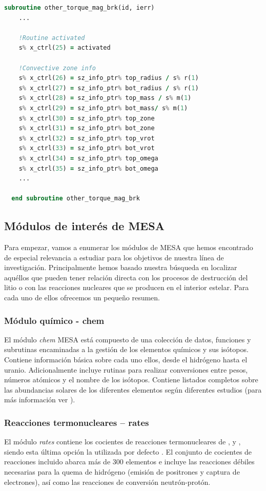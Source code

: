 \begin{lstlisting}[language=Fortran, float, caption={Ejemplo de asignación de valores calculados para la zona convectiva a los parámetros extras definidos.}, label={lst:extra_name_columns}]
  subroutine other_torque_mag_brk(id, ierr)	
    ...
  
    !Routine activated
    s% x_ctrl(25) = activated

    !Convective zone info
    s% x_ctrl(26) = sz_info_ptr% top_radius / s% r(1)
    s% x_ctrl(27) = sz_info_ptr% bot_radius / s% r(1)
    s% x_ctrl(28) = sz_info_ptr% top_mass / s% m(1)
    s% x_ctrl(29) = sz_info_ptr% bot_mass/ s% m(1)
    s% x_ctrl(30) = sz_info_ptr% top_zone
    s% x_ctrl(31) = sz_info_ptr% bot_zone
    s% x_ctrl(32) = sz_info_ptr% top_vrot
    s% x_ctrl(33) = sz_info_ptr% bot_vrot
    s% x_ctrl(34) = sz_info_ptr% top_omega
    s% x_ctrl(35) = sz_info_ptr% bot_omega
    ...
  
  end subroutine other_torque_mag_brk
\end{lstlisting}


\subsection{Módulos de interés de MESA}
Para empezar, vamos a enumerar los módulos de MESA que hemos encontrado de especial relevancia a estudiar para los objetivos de nuestra línea de investigación. Principalmente hemos basado nuestra búsqueda en localizar aquéllos que pueden tener relación directa con los procesos de destrucción del litio o con las reacciones nucleares que se producen en el interior estelar. Para cada uno de ellos ofrecemos un pequeño resumen.

\subsubsection{Módulo químico - chem}
El módulo \textit{chem} MESA está compuesto de una colección de datos, funciones y subrutinas encaminadas a la gestión de los elementos químicos y sus isótopos. Contiene información básica sobre cada uno ellos, desde el hidrógeno hasta el uranio. Adicionalmente incluye rutinas para realizar conversiones entre pesos, números atómicos y el nombre de los isótopos. Contiene listados completos sobre las abundancias solares de los diferentes elementos según diferentes estudios (para más información ver \cite{Paxton2011}).\par

\subsubsection{Reacciones termonucleares – rates}
El módulo \textit{rates} contiene los cocientes de reacciones termonucleares de \cite{Caughlan1988}, y \cite{Angulo1999}, siendo esta última opción la utilizada por defecto \cite{Paxton2011}. El conjunto de cocientes de reacciones incluido abarca más de 300 elementos e incluye las reacciones débiles necesarias para la quema de hidrógeno (emisión de positrones y captura de electrones), así como las reacciones de conversión neutrón-protón.

